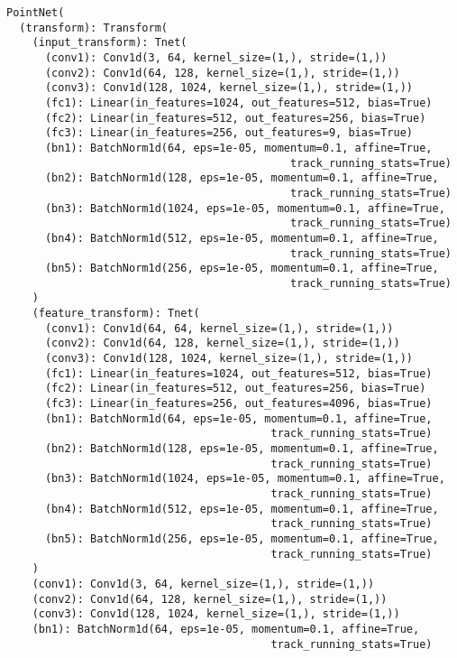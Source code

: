 \begin{verbatim}
PointNet(
  (transform): Transform(
    (input_transform): Tnet(
      (conv1): Conv1d(3, 64, kernel_size=(1,), stride=(1,))
      (conv2): Conv1d(64, 128, kernel_size=(1,), stride=(1,))
      (conv3): Conv1d(128, 1024, kernel_size=(1,), stride=(1,))
      (fc1): Linear(in_features=1024, out_features=512, bias=True)
      (fc2): Linear(in_features=512, out_features=256, bias=True)
      (fc3): Linear(in_features=256, out_features=9, bias=True)
      (bn1): BatchNorm1d(64, eps=1e-05, momentum=0.1, affine=True,
                                            track_running_stats=True)
      (bn2): BatchNorm1d(128, eps=1e-05, momentum=0.1, affine=True,
                                            track_running_stats=True)
      (bn3): BatchNorm1d(1024, eps=1e-05, momentum=0.1, affine=True,
                                            track_running_stats=True)
      (bn4): BatchNorm1d(512, eps=1e-05, momentum=0.1, affine=True,
                                            track_running_stats=True)
      (bn5): BatchNorm1d(256, eps=1e-05, momentum=0.1, affine=True,
                                            track_running_stats=True)
    )
    (feature_transform): Tnet(
      (conv1): Conv1d(64, 64, kernel_size=(1,), stride=(1,))
      (conv2): Conv1d(64, 128, kernel_size=(1,), stride=(1,))
      (conv3): Conv1d(128, 1024, kernel_size=(1,), stride=(1,))
      (fc1): Linear(in_features=1024, out_features=512, bias=True)
      (fc2): Linear(in_features=512, out_features=256, bias=True)
      (fc3): Linear(in_features=256, out_features=4096, bias=True)
      (bn1): BatchNorm1d(64, eps=1e-05, momentum=0.1, affine=True,
                                         track_running_stats=True)
      (bn2): BatchNorm1d(128, eps=1e-05, momentum=0.1, affine=True,
                                         track_running_stats=True)
      (bn3): BatchNorm1d(1024, eps=1e-05, momentum=0.1, affine=True,
                                         track_running_stats=True)
      (bn4): BatchNorm1d(512, eps=1e-05, momentum=0.1, affine=True,
                                         track_running_stats=True)
      (bn5): BatchNorm1d(256, eps=1e-05, momentum=0.1, affine=True,
                                         track_running_stats=True)
    )
    (conv1): Conv1d(3, 64, kernel_size=(1,), stride=(1,))
    (conv2): Conv1d(64, 128, kernel_size=(1,), stride=(1,))
    (conv3): Conv1d(128, 1024, kernel_size=(1,), stride=(1,))
    (bn1): BatchNorm1d(64, eps=1e-05, momentum=0.1, affine=True,
                                         track_running_stats=True)

\end{verbatim}

